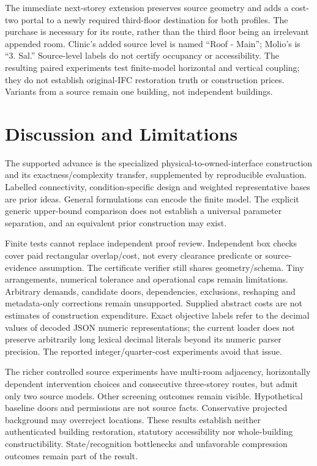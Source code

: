 The immediate next-storey extension preserves source geometry and adds a cost-two portal to a newly required third-floor destination for both profiles. The purchase is necessary for its route, rather than the third floor being an irrelevant appended room. Clinic's added source level is named ``Roof - Main''; Molio's is ``3. Sal.'' Source-level labels do not certify occupancy or accessibility. The resulting paired experiments test finite-model horizontal and vertical coupling; they do not establish original-IFC restoration truth or construction prices. Variants from a source remain one building, not independent buildings.

\section{Discussion and Limitations}
The supported advance is the specialized physical-to-owned-interface construction and its exactness/complexity transfer, supplemented by reproducible evaluation. Labelled connectivity, condition-specific design and weighted representative bases are prior ideas. General formulations can encode the finite model. The explicit generic upper-bound comparison does not establish a universal parameter separation, and an equivalent prior construction may exist.

Finite tests cannot replace independent proof review. Independent box checks cover paid rectangular overlap/cost, not every clearance predicate or source-evidence assumption. The certificate verifier still shares geometry/schema. Tiny arrangements, numerical tolerance and operational caps remain limitations. Arbitrary demands, candidate doors, dependencies, exclusions, reshaping and metadata-only corrections remain unsupported. Supplied abstract costs are not estimates of construction expenditure. Exact objective labels refer to the decimal values of decoded JSON numeric representations; the current loader does not preserve arbitrarily long lexical decimal literals beyond its numeric parser precision. The reported integer/quarter-cost experiments avoid that issue.

The richer controlled source experiments have multi-room adjacency, horizontally dependent intervention choices and consecutive three-storey routes, but admit only two source models. Other screening outcomes remain visible. Hypothetical baseline doors and permissions are not source facts. Conservative projected background may overreject locations. These results establish neither authenticated building restoration, statutory accessibility nor whole-building constructibility. State/recognition bottlenecks and unfavorable compression outcomes remain part of the result.


